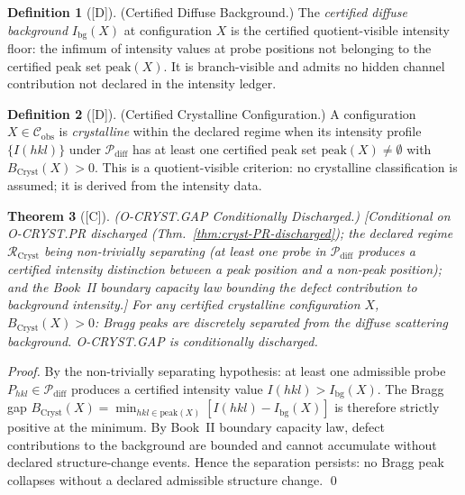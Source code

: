 \documentclass[12pt,oneside]{amsbook}
\theoremstyle{plain}
\newtheorem{theorem}{Theorem}[section]
\theoremstyle{definition}
\newtheorem{definition}[theorem]{Definition}
\theoremstyle{remark}
\newcommand{\status}[1]{\textup{[#1]}}
\begin{document}
\begin{definition}[\status{D}]\label{def:cryst-diffuse-background}
\textup{(Certified Diffuse Background.)}
The \emph{certified diffuse background} $I_{\mathrm{bg}}(X)$ at
configuration $X$ is the certified quotient-visible intensity floor:
the infimum of intensity values at probe positions not belonging to
the certified peak set $\mathrm{peak}(X)$.  It is branch-visible and
admits no hidden channel contribution not declared in the intensity
ledger.
\end{definition}

\begin{definition}[\status{D}]\label{def:cryst-periodic-config}
\textup{(Certified Crystalline Configuration.)}
A configuration $X \in \mathcal{C}_{\mathrm{obs}}$ is
\emph{crystalline} within the declared regime when its intensity
profile $\{I(hkl)\}$ under $\mathcal{P}_{\mathrm{diff}}$ has at
least one certified peak set $\mathrm{peak}(X) \neq \emptyset$ with
$B_{\mathrm{Cryst}}(X) > 0$.  This is a quotient-visible criterion:
no crystalline classification is assumed; it is derived from the
intensity data.
\end{definition}

\begin{theorem}[\status{C}]\label{thm:cryst-GAP-discharged}
\textup{(O-CRYST.GAP Conditionally Discharged.)}
\textup{[Conditional on O-CRYST.PR discharged
(Thm.~\ref{thm:cryst-PR-discharged}); the declared regime
$\mathcal{R}_{\mathrm{Cryst}}$ being non-trivially separating (at
least one probe in $\mathcal{P}_{\mathrm{diff}}$ produces a
certified intensity distinction between a peak position and a
non-peak position); and the Book~II boundary capacity law bounding
the defect contribution to background intensity.]}
For any certified crystalline configuration $X$,
$B_{\mathrm{Cryst}}(X) > 0$: Bragg peaks are discretely separated
from the diffuse scattering background.  O-CRYST.GAP is
conditionally discharged.
\end{theorem}

\begin{proof}
By the non-trivially separating hypothesis: at least one admissible
probe $P_{hkl} \in \mathcal{P}_{\mathrm{diff}}$ produces a
certified intensity value $I(hkl) > I_{\mathrm{bg}}(X)$.
The Bragg gap $B_{\mathrm{Cryst}}(X) = \min_{hkl \in \mathrm{peak}(X)}
[I(hkl) - I_{\mathrm{bg}}(X)]$ is therefore strictly positive at
the minimum.  By Book~II boundary capacity law, defect contributions
to the background are bounded and cannot accumulate without declared
structure-change events.  Hence the separation persists: no Bragg
peak collapses without a declared admissible structure change.
\qed
\end{proof}
\end{document}
